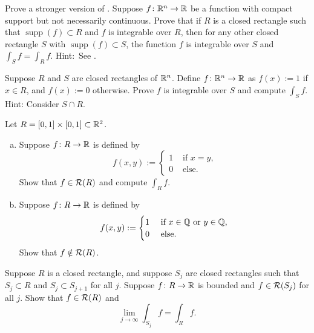 \begin{exercise}
Prove a stronger version of .
Suppose $f \colon {\mathbb{R}}^n \to {\mathbb{R}}$ be a function with compact support but not
necessarily continuous.
Prove that
if $R$ is a closed rectangle such that $\operatorname{supp}(f) \subset R$
and $f$ is integrable over $R$, then for any other closed rectangle
$S$ with $\operatorname{supp}(f) \subset S$,
the function $f$ is integrable over $S$ and
$\int_S f = \int_R f$.
Hint:~See .
\end{exercise}

\begin{exercise}
Suppose $R$ and $S$ are closed rectangles of ${\mathbb{R}}^n$.
Define $f \colon {\mathbb{R}}^n \to {\mathbb{R}}$ as $f(x) := 1$ if 
$x \in R$, and $f(x) := 0$ otherwise.  Prove $f$ is integrable over $S$
and compute $\int_S f$.  Hint: Consider $S \cap R$.
\end{exercise}

\begin{samepage}
\begin{exercise}
Let $R = [0,1] \times [0,1] \subset {\mathbb{R}}^2$.
\begin{enumerate}[a)]
\item
Suppose $f \colon R \to {\mathbb{R}}$ is defined by
\begin{equation*}
f(x,y) := 
\begin{cases}
1 & \text{ if $x = y$,} \\
0 & \text{ else.}
\end{cases}
\end{equation*}
Show that $f \in {\mathcal{R}}(R)$ and compute $\int_R f$.
\item
Suppose $f \colon R \to {\mathbb{R}}$ is defined by
\begin{equation*}
f(x,y) := 
\begin{cases}
1 & \text{ if $x \in {\mathbb{Q}}$ or $y \in {\mathbb{Q}}$,} \\
0 & \text{ else.}
\end{cases}
\end{equation*}
Show that $f \notin {\mathcal{R}}(R)$.
\end{enumerate}
\end{exercise}
\end{samepage}

\begin{exercise}
Suppose $R$ is a closed rectangle, and suppose $S_j$ are closed rectangles
such that $S_j \subset R$ and $S_j \subset S_{j+1}$ for all $j$.
Suppose $f \colon R \to {\mathbb{R}}$ is bounded and $f \in {\mathcal{R}}(S_j)$ for all $j$.
Show that $f \in {\mathcal{R}}(R)$ and
\begin{equation*}
\lim_{j\to\infty} \int_{S_j} f = \int_R f .
\end{equation*}
\end{exercise}

